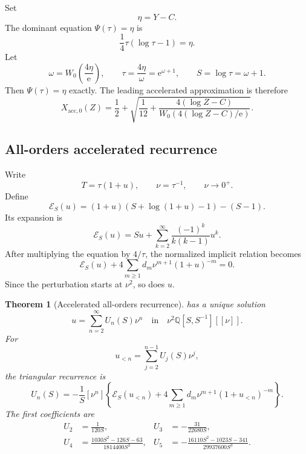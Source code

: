 \documentclass[11pt,a4paper]{article}
\numberwithin{equation}{section}
\newtheorem{theorem}{Theorem}[section]
\theoremstyle{remark}
\newcommand{\e}{\mathrm e}
\newcommand{\coeff}[2]{[{}#1^{#2}]}
\begin{document}
Set
\begin{equation}
\eta=Y-C.
\label{eq:eta}
\end{equation}
The dominant equation \(\Psi(\tau)=\eta\) is
\[
\frac14\tau(\log\tau-1)=\eta.
\]
Let
\begin{equation}
\omega=W_0\!\left(\frac{4\eta}{\e}\right),
\qquad
\tau=\frac{4\eta}{\omega}=\e^{\omega+1},
\qquad
S=\log\tau=\omega+1.
\label{eq:tau-S}
\end{equation}
Then \(\Psi(\tau)=\eta\) exactly.  The leading accelerated approximation is
therefore
\begin{equation}
\boxed{
X_{\mathrm{acc},0}(Z)
=\frac12+
\sqrt{\frac1{12}+
\frac{4(\log Z-C)}{W_0(4(\log Z-C)/\e)}}.
}
\label{eq:accelerated-leading}
\end{equation}

\subsection{All-orders accelerated recurrence}

Write
\begin{equation}
T=\tau(1+u),
\qquad
\nu=\tau^{-1},
\qquad
\nu\to0^+.
\label{eq:T-u}
\end{equation}
Define
\begin{equation}
\mathcal E_S(u)
=(1+u)(S+\log(1+u)-1)-(S-1).
\label{eq:E-S}
\end{equation}
Its expansion is
\begin{equation}
\mathcal E_S(u)=Su+
\sum_{k=2}^{\infty}\frac{(-1)^k}{k(k-1)}u^k.
\label{eq:E-S-expansion}
\end{equation}
After multiplying the equation by \(4/\tau\), the normalized implicit
relation becomes
\begin{equation}
\boxed{
\mathcal E_S(u)+4\sum_{m\ge1}d_m\nu^{m+1}(1+u)^{-m}=0.
}
\label{eq:accelerated-implicit}
\end{equation}
Since the perturbation starts at \(\nu^2\), so does \(u\).

\begin{theorem}[Accelerated all-orders recurrence]
\label{thm:accelerated-recurrence}
 has a unique solution
\begin{equation}
u=\sum_{n=2}^{\infty}U_n(S)\nu^n
\quad\text{in}\quad
\nu^2\mathbb Q[S,S^{-1}][[\nu]].
\label{eq:u-series}
\end{equation}
For
\[
u_{<n}=\sum_{j=2}^{n-1}U_j(S)\nu^j,
\]
the triangular recurrence is
\begin{equation}
U_n(S)=-\frac1S\coeff{\nu}{n}\left\{
\mathcal E_S(u_{<n})
+4\sum_{m\ge1}d_m\nu^{m+1}(1+u_{<n})^{-m}
\right\}.
\label{eq:U-recurrence}
\end{equation}
The first coefficients are
\begin{align}
U_2&=\frac1{120S},
&U_3&=-\frac{31}{22680S},
\label{eq:U2U3}\\
U_4&=\frac{1030S^2-126S-63}{1814400S^3},
&U_5&=-\frac{16110S^2-1023S-341}{29937600S^3}.
\label{eq:U4U5}
\end{align}
\end{theorem}
\end{document}
